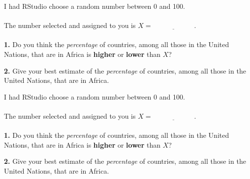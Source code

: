\documentclass[12pt]{article}
\title{}
\date{}
\begin{document}
\maketitle
\thispagestyle{empty}




I had RStudio choose a random number between 0 and 100.\\ \\

The number selected and assigned to you is $X={\underline{\hspace{1in}}}$.\\ \\

{\bf 1.}  Do you think the \textsl{percentage} of countries, among all those in the United Nations, that are in Africa is {\bf higher} or {\bf lower} than $X$?

\vspace{.5in}

{\bf 2.} Give your best estimate of the \textsl{percentage} of countries, among all those in the United Nations, that are in Africa.

\vspace{2in}

I had RStudio choose a random number between 0 and 100.\\ \\

The number selected and assigned to you is $X={\underline{\hspace{1in}}}$.\\ \\

{\bf 1.}  Do you think the \textsl{percentage} of countries, among all those in the United Nations, that are in Africa is {\bf higher} or {\bf lower} than $X$?

\vspace{.5in}

{\bf 2.} Give your best estimate of the \textsl{percentage} of countries, among all those in the United Nations, that are in Africa.

\vspace{2in}
\end{document}
